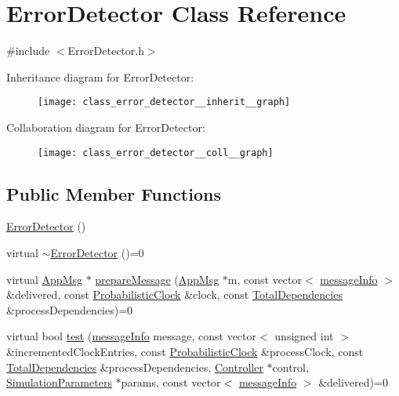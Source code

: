 \hypertarget{class_error_detector}{}\section{Error\+Detector Class Reference}
\label{class_error_detector}


{\ttfamily \#include $<$Error\+Detector.\+h$>$}



Inheritance diagram for Error\+Detector\+:\nopagebreak
\begin{figure}[H]
\begin{center}
\leavevmode
\texttt{[image: class\_error\_detector\_\_inherit\_\_graph]}
\end{center}
\end{figure}


Collaboration diagram for Error\+Detector\+:\nopagebreak
\begin{figure}[H]
\begin{center}
\leavevmode
\texttt{[image: class\_error\_detector\_\_coll\_\_graph]}
\end{center}
\end{figure}
\subsection*{Public Member Functions}
\begin{DoxyCompactItemize}
\item 
\hyperlink{class_error_detector_ae851a02dff242968cd6419400271d74f}{Error\+Detector} ()
\item 
virtual \hyperlink{class_error_detector_a3708d713f8f7bee01aa7e5a2fb7bb652}{$\sim$\+Error\+Detector} ()=0
\item 
virtual \hyperlink{class_app_msg}{App\+Msg} $\ast$ \hyperlink{class_error_detector_a8cac1f6ac6803da4379df7891789c490}{prepare\+Message} (\hyperlink{class_app_msg}{App\+Msg} $\ast$m, const vector$<$ \hyperlink{structures_8h_a7e7bdc1d2fff8a9436f2f352b2711ed6}{message\+Info} $>$ \&delivered, const \hyperlink{class_probabilistic_clock}{Probabilistic\+Clock} \&clock, const \hyperlink{class_total_dependencies}{Total\+Dependencies} \&process\+Dependencies)=0
\item 
virtual bool \hyperlink{class_error_detector_afc717d04768dd207196c08e24163115c}{test} (\hyperlink{structures_8h_a7e7bdc1d2fff8a9436f2f352b2711ed6}{message\+Info} message, const vector$<$ unsigned int $>$ \&incremented\+Clock\+Entries, const \hyperlink{class_probabilistic_clock}{Probabilistic\+Clock} \&process\+Clock, const \hyperlink{class_total_dependencies}{Total\+Dependencies} \&process\+Dependencies, \hyperlink{class_controller}{Controller} $\ast$control, \hyperlink{class_simulation_parameters}{Simulation\+Parameters} $\ast$params, const vector$<$ \hyperlink{structures_8h_a7e7bdc1d2fff8a9436f2f352b2711ed6}{message\+Info} $>$ \&delivered)=0
\end{DoxyCompactItemize}

